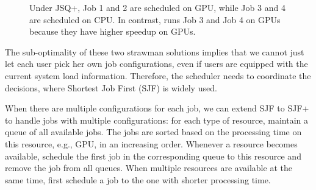 \begin{figure}[h]
	\centering
	    \hspace{0.0in}
	    \hspace{0.0in}	
	\caption{Under JSQ+, Job 1 and 2 are scheduled on GPU, while Job 3 and 4 are scheduled on CPU. In contrast, \name runs Job 3 and Job 4 on GPUs because they have higher speedup on GPUs. } %
	\label{fig:JSQ}
\end{figure}




The sub-optimality of these two strawman solutions implies that we cannot just let each user pick her own job configurations, even if users are equipped with the current system load information. 
Therefore, the scheduler needs to coordinate the decisions, where Shortest Job First (SJF) is widely used.

When there are multiple configurations for each job, we can extend SJF to SJF+ to handle jobs with multiple configurations: for each type of resource, maintain a queue of all available jobs. The jobs are sorted based on the processing time on this resource, e.g., GPU, in an increasing order. Whenever a resource becomes available, schedule the first job in the corresponding queue to this resource and remove the job from all queues. When multiple resources are available at the same time, first schedule a job to the one with shorter processing time. 

